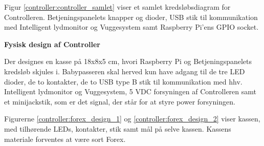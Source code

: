 Figur \ref{controller:controller_samlet} viser et samlet kredsløbsdiagram for Controlleren. Betjeningspanelets knapper og dioder, USB stik til kommunikation med Intelligent lydmonitor og Vuggesystem samt Raspberry Pi'ens GPIO socket.


\textbf{Fysisk design af Controller} \label{forex_controller}

Der designes en kasse på 18x8x5 cm, hvori Raspberry Pi og Betjeningspanelets kredsløb skjules i. Babypasseren skal herved kun have adgang til de tre LED dioder, de to kontakter, de to USB type B stik til kommunikation med hhv. Intelligent lydmonitor og Vuggesystem, 5 VDC forsyningen af Controlleren samt et minijackstik, som er det signal, der står for at styre power forsyningen. 

Figurerne \ref{controller:forex_design_1} og \ref{controller:forex_design_2} viser kassen, med tilhørende LEDs, kontakter, stik samt mål på selve kassen. Kassens materiale forventes at være sort Forex.  




